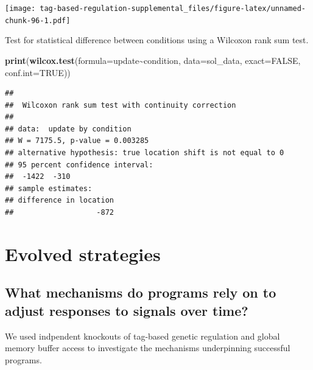 \documentclass[
]{book}
\newenvironment{Shaded}{\begin{snugshade}}{\end{snugshade}}
\newcommand{\DataTypeTok}[1]{\textcolor[rgb]{0.13,0.29,0.53}{#1}}
\newcommand{\KeywordTok}[1]{\textcolor[rgb]{0.13,0.29,0.53}{\textbf{#1}}}
\newcommand{\NormalTok}[1]{#1}
\newcommand{\OperatorTok}[1]{\textcolor[rgb]{0.81,0.36,0.00}{\textbf{#1}}}
\newcommand{\OtherTok}[1]{\textcolor[rgb]{0.56,0.35,0.01}{#1}}
\begin{document}
\texttt{[image: tag-based-regulation-supplemental\_files/figure-latex/unnamed-chunk-96-1.pdf]}

Test for statistical difference between conditions using a Wilcoxon rank sum test.

\begin{Shaded}
\begin{Highlighting}[]
\KeywordTok{print}\NormalTok{(}\KeywordTok{wilcox.test}\NormalTok{(}\DataTypeTok{formula=}\NormalTok{update}\OperatorTok{\textasciitilde{}}\NormalTok{condition, }\DataTypeTok{data=}\NormalTok{sol\_data, }\DataTypeTok{exact=}\OtherTok{FALSE}\NormalTok{, }\DataTypeTok{conf.int=}\OtherTok{TRUE}\NormalTok{))}
\end{Highlighting}
\end{Shaded}

\begin{verbatim}
## 
##  Wilcoxon rank sum test with continuity correction
## 
## data:  update by condition
## W = 7175.5, p-value = 0.003285
## alternative hypothesis: true location shift is not equal to 0
## 95 percent confidence interval:
##  -1422  -310
## sample estimates:
## difference in location 
##                   -872
\end{verbatim}

\hypertarget{evolved-strategies-2}{%
\section{Evolved strategies}\label{evolved-strategies-2}}

\hypertarget{what-mechanisms-do-programs-rely-on-to-adjust-responses-to-signals-over-time-2}{%
\subsection{What mechanisms do programs rely on to adjust responses to signals over time?}\label{what-mechanisms-do-programs-rely-on-to-adjust-responses-to-signals-over-time-2}}

We used indpendent knockouts of tag-based genetic regulation and global memory buffer access to investigate the mechanisms underpinning successful programs.
\end{document}
